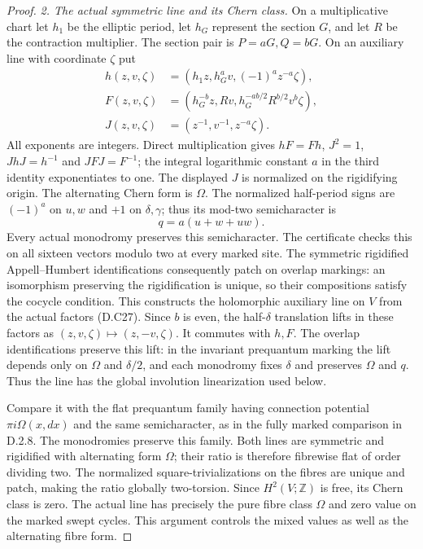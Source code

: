 \begin{proof}
\emph{2. The actual symmetric line and its Chern class.}
On a multiplicative chart let $h_1$ be the elliptic period, let $h_G$
represent the section $G$, and let $R$ be the contraction multiplier.
The section pair is $P=aG,Q=bG$. On an auxiliary line with coordinate
$\zeta$ put
\[
\begin{aligned}
 h(z,v,\zeta)&=(h_1z,h_G^av,(-1)^a z^{-a}\zeta),\\
 F(z,v,\zeta)&=(h_G^{-b}z,Rv,
                 h_G^{-ab/2}R^{b/2}v^b\zeta),\\
 J(z,v,\zeta)&=(z^{-1},v^{-1},z^{-a}\zeta).
\end{aligned}                                                   \tag{D.C27}
\]
All exponents are integers. Direct multiplication gives
$hF=Fh$, $J^2=1$, $JhJ=h^{-1}$ and $JFJ=F^{-1}$; the integral
logarithmic constant $a$ in the third identity exponentiates to one.
The displayed $J$ is normalized on the rigidifying origin.
The alternating Chern form is $\Omega$. The normalized half-period
signs are $(-1)^a$ on $u,w$ and $+1$ on $\delta,\gamma$; thus its
mod-two semicharacter is
\[
                    q=a(u+w+uw).                              \tag{D.C28}
\]
Every actual monodromy preserves this semicharacter. The certificate
checks this on all sixteen vectors modulo two at every marked site.
The symmetric rigidified Appell--Humbert identifications consequently
patch on overlap markings: an isomorphism preserving the rigidification
is unique, so their compositions satisfy the cocycle condition.
This constructs the holomorphic auxiliary line on $V$ from the actual
factors (D.C27).
Since $b$ is even, the half-$\delta$ translation lifts in these factors
as $(z,v,\zeta)\mapsto(z,-v,\zeta)$. It commutes with $h,F$.
The overlap identifications preserve this lift: in the invariant
prequantum marking the lift depends only on $\Omega$ and $\delta/2$,
and each monodromy fixes $\delta$ and preserves $\Omega$ and $q$.
Thus the line has the global involution linearization used below.

Compare it with the flat prequantum family having connection potential
$\pi i\Omega(x,dx)$ and the same semicharacter, as in the fully marked
comparison in D.2.8. The monodromies preserve this family. Both lines
are symmetric and rigidified with alternating form $\Omega$; their
ratio is therefore fibrewise flat of order dividing two. The normalized
square-trivializations on the fibres are unique and patch, making the
ratio globally two-torsion. Since $H^2(V;\mathbb Z)$ is free, its Chern
class is zero. The actual line has precisely the pure fibre class
$\Omega$ and zero value on the marked swept cycles. This argument
controls the mixed values as well as the alternating fibre form.


\end{proof}

